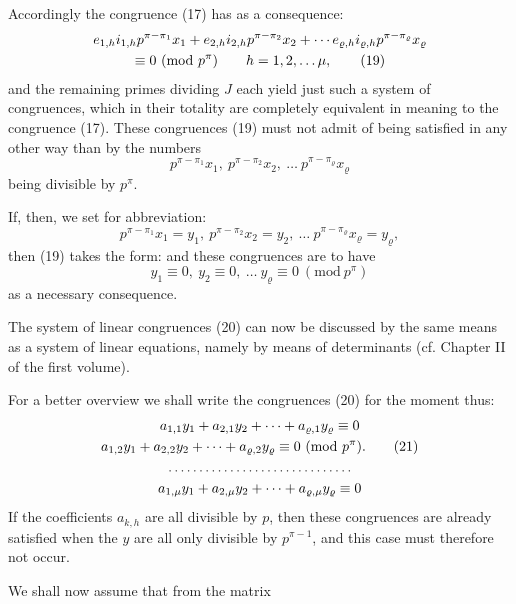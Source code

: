 Accordingly the congruence (17) has as a consequence:
\begin{gather}
e_{1,h}i_{1,h}p^{\pi-\pi_1}x_1 + e_{2,h}i_{2,h}p^{\pi-\pi_2}x_2 + \cdots e_{\varrho,h}i_{\varrho,h}p^{\pi-\pi_\varrho}x_\varrho \notag\\
\equiv 0\ (\mathrm{mod}\ p^\pi) \qquad h = 1, 2, \dots \mu, \tag{19}
\end{gather}
and the remaining primes dividing $J$ each yield just such a
system of congruences, which in their totality are completely
equivalent in meaning to the congruence (17). These
congruences (19) must not admit of being satisfied in any other way
than by the numbers
\[
p^{\pi-\pi_1}x_1,\ p^{\pi-\pi_2}x_2,\ \dots\ p^{\pi-\pi_\varrho}x_\varrho
\]
being divisible by $p^\pi$.

    If, then, we set for abbreviation:
\[
p^{\pi-\pi_1}x_1 = y_1,\ p^{\pi-\pi_2}x_2 = y_2,\ \dots\ p^{\pi-\pi_\varrho}x_\varrho = y_\varrho,
\]
then (19) takes the form:
and these congruences are to have
\[
y_1 \equiv 0,\ y_2 \equiv 0,\ \dots\ y_\varrho \equiv 0\ (\mathrm{mod}\ p^\pi)
\]
as a necessary consequence.

    The system of linear congruences (20) can now be discussed
by the same means as a system of linear equations, namely by
means of determinants (cf. Chapter II of the first volume).

    For a better overview we shall write the congruences (20)
for the moment thus:
\begin{gather}
a_{1,1}y_1 + a_{2,1}y_2 + \cdots + a_{\varrho,1}y_\varrho \equiv 0 \notag\\
a_{1,2}y_1 + a_{2,2}y_2 + \cdots + a_{\varrho,2}y_\varrho \equiv 0\ (\mathrm{mod}\ p^\pi). \tag{21}\\
\dots\dots\dots\dots\dots\dots\dots\dots\dots\dots \notag\\
a_{1,\mu}y_1 + a_{2,\mu}y_2 + \cdots + a_{\varrho,\mu}y_\varrho \equiv 0 \notag
\end{gather}
If the coefficients $a_{k,h}$ are all divisible by $p$, then
these congruences are already satisfied when the $y$ are all only
divisible by $p^{\pi-1}$, and this case must therefore not occur.

    We shall now assume that from the matrix
